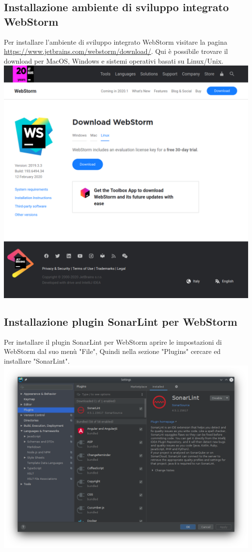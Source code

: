 \subsection{Installazione ambiente di sviluppo integrato WebStorm}
Per installare l'ambiente di sviluppo integrato WebStorm visitare la pagina \url{https://www.jetbrains.com/webstorm/download/}. Qui è possibile trovare il download per MacOS, Windows e sistemi operativi basati su Linux/Unix.
\\
\includegraphics[width=\textwidth,height=\textheight,keepaspectratio]{img/webstorm.png}

\subsection{Installazione plugin SonarLint per WebStorm}
Per installare il plugin SonarLint per WebStorm aprire le impostazioni di WebStorm dal suo menù "File", Quindi nella sezione "Plugins" cercare ed installare "SonarLint".
\\
\includegraphics[width=\textwidth,height=\textheight,keepaspectratio]{img/sonarlint.png}

